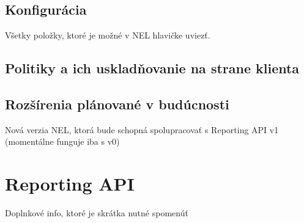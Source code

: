 \subsection{Konfigurácia}

Všetky položky, ktoré je možné v NEL hlavičke uviezť.

\subsection{Politiky a ich uskladňovanie na strane klienta}
\label{nel-policies}


\subsection{Rozšírenia plánované v budúcnosti}

Nová verzia NEL, ktorá bude schopná spolupracovať s Reporting API v1 (momentálne funguje iba s v0)



\section{Reporting API}
\label{reporting-api}

Doplnkové info, ktoré je skrátka nutné spomenúť \cite{W3C-reporting-api}
